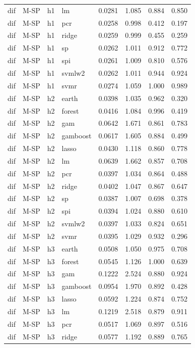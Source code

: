 \begin{ThreePartTable}
\begin{longtable}[t]{llclcccc}
dif & M-SP & h1 & lm & 0.0281 & 1.085 & 0.884 & 0.850\\
dif & M-SP & h1 & pcr & 0.0258 & 0.998 & 0.412 & 0.197\\
dif & M-SP & h1 & ridge & 0.0259 & 0.999 & 0.455 & 0.259\\
dif & M-SP & h1 & sp & 0.0262 & 1.011 & 0.912 & 0.772\\
dif & M-SP & h1 & spi & 0.0261 & 1.009 & 0.810 & 0.576\\
dif & M-SP & h1 & svmlw2 & 0.0262 & 1.011 & 0.944 & 0.924\\
dif & M-SP & h1 & svmr & 0.0274 & 1.059 & 1.000 & 0.989\\
\addlinespace
dif & M-SP & h2 & earth & 0.0398 & 1.035 & 0.962 & 0.320\\
dif & M-SP & h2 & forest & 0.0416 & 1.084 & 0.996 & 0.419\\
dif & M-SP & h2 & gam & 0.0642 & 1.671 & 0.861 & 0.783\\
dif & M-SP & h2 & gamboost & 0.0617 & 1.605 & 0.884 & 0.499\\
dif & M-SP & h2 & lasso & 0.0430 & 1.118 & 0.860 & 0.778\\
dif & M-SP & h2 & lm & 0.0639 & 1.662 & 0.857 & 0.708\\
dif & M-SP & h2 & pcr & 0.0397 & 1.034 & 0.864 & 0.488\\
dif & M-SP & h2 & ridge & 0.0402 & 1.047 & 0.867 & 0.647\\
dif & M-SP & h2 & sp & 0.0387 & 1.007 & 0.698 & 0.378\\
dif & M-SP & h2 & spi & 0.0394 & 1.024 & 0.880 & 0.610\\
dif & M-SP & h2 & svmlw2 & 0.0397 & 1.033 & 0.824 & 0.651\\
dif & M-SP & h2 & svmr & 0.0395 & 1.029 & 0.932 & 0.296\\
\addlinespace
dif & M-SP & h3 & earth & 0.0508 & 1.050 & 0.975 & 0.708\\
dif & M-SP & h3 & forest & 0.0545 & 1.126 & 1.000 & 0.639\\
dif & M-SP & h3 & gam & 0.1222 & 2.524 & 0.880 & 0.924\\
dif & M-SP & h3 & gamboost & 0.0954 & 1.970 & 0.892 & 0.428\\
dif & M-SP & h3 & lasso & 0.0592 & 1.224 & 0.874 & 0.752\\
dif & M-SP & h3 & lm & 0.1219 & 2.518 & 0.879 & 0.911\\
dif & M-SP & h3 & pcr & 0.0517 & 1.069 & 0.897 & 0.516\\
dif & M-SP & h3 & ridge & 0.0577 & 1.192 & 0.889 & 0.765\\

\end{longtable}
\end{ThreePartTable}
